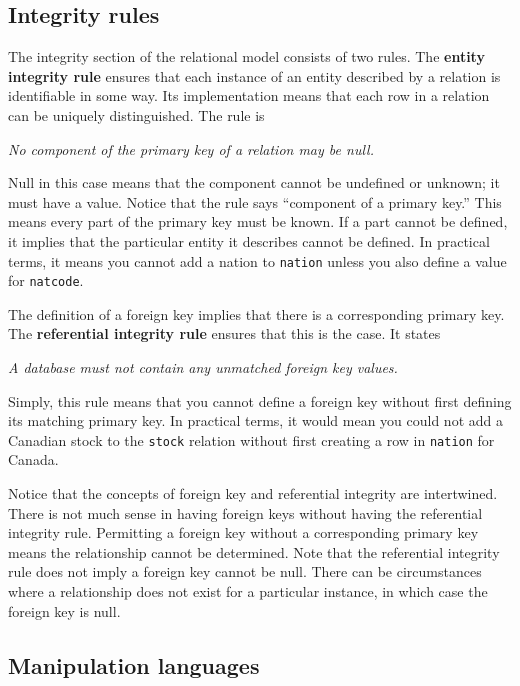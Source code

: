 \documentclass[
]{article}
\begin{document}
\hypertarget{integrity-rules}{%
\subsection*{Integrity rules}\label{integrity-rules}}

The integrity section of the relational model consists of two rules. The
\textbf{entity integrity rule} ensures that each instance of an entity
described by a relation is identifiable in some way. Its implementation
means that each row in a relation can be uniquely distinguished. The
rule is

\emph{No component of the primary key of a relation may be null.}

Null in this case means that the component cannot be undefined or
unknown; it must have a value. Notice that the rule says ``component of a
primary key.'' This means every part of the primary key must be known. If
a part cannot be defined, it implies that the particular entity it
describes cannot be defined. In practical terms, it means you cannot add
a nation to \texttt{nation} unless you also define a value for \texttt{natcode}.

The definition of a foreign key implies that there is a corresponding
primary key. The \textbf{referential integrity rule} ensures that this is the
case. It states

\emph{A database must not contain any unmatched foreign key values.}

Simply, this rule means that you cannot define a foreign key without
first defining its matching primary key. In practical terms, it would
mean you could not add a Canadian stock to the \texttt{stock} relation without
first creating a row in \texttt{nation} for Canada.

Notice that the concepts of foreign key and referential integrity are
intertwined. There is not much sense in having foreign keys without
having the referential integrity rule. Permitting a foreign key without
a corresponding primary key means the relationship cannot be determined.
Note that the referential integrity rule does not imply a foreign key
cannot be null. There can be circumstances where a relationship does not
exist for a particular instance, in which case the foreign key is null.

\hypertarget{manipulation-languages}{%
\subsection*{Manipulation languages}\label{manipulation-languages}}
\end{document}
